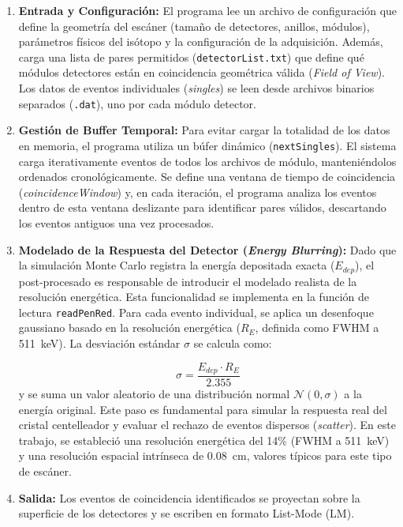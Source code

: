 \begin{enumerate}
  \item \textbf{Entrada y Configuración:}
        El programa lee un archivo de configuración que define la geometría del escáner (tamaño de detectores, anillos, módulos), parámetros físicos del isótopo y la configuración de la adquisición. Además, carga una lista de pares permitidos (\texttt{detectorList.txt}) que define qué módulos detectores están en coincidencia geométrica válida (\textit{Field of View}). Los datos de eventos individuales (\textit{singles}) se leen desde archivos binarios separados (\texttt{.dat}), uno por cada módulo detector.
  \item \textbf{Gestión de Buffer Temporal:}
        Para evitar cargar la totalidad de los datos en memoria, el programa utiliza un búfer dinámico (\texttt{nextSingles}). El sistema carga iterativamente eventos de todos los archivos de módulo, manteniéndolos ordenados cronológicamente. Se define una ventana de tiempo de coincidencia (\textit{coincidenceWindow}) y, en cada iteración, el programa analiza los eventos dentro de esta ventana deslizante para identificar pares válidos, descartando los eventos antiguos una vez procesados.
  \item \textbf{Modelado de la Respuesta del Detector (\textit{Energy Blurring}):}
        Dado que la simulación Monte Carlo registra la energía depositada exacta ($E_{dep}$), el post-procesado es responsable de introducir el modelado realista de la resolución energética. Esta funcionalidad se implementa en la función de lectura \texttt{readPenRed}. Para cada evento individual, se aplica un desenfoque gaussiano basado en la resolución energética ($R_E$, definida como FWHM a \SI{511}{\kilo\electronvolt}). La desviación estándar $\sigma$ se calcula como:

        \begin{equation}
          \sigma = \frac{E_{dep} \cdot R_E}{2.355}
        \end{equation}
        y se suma un valor aleatorio de una distribución normal $\mathcal{N}(0, \sigma)$ a la energía original. Este paso es fundamental para simular la respuesta real del cristal centelleador y evaluar el rechazo de eventos dispersos (\textit{scatter}). En este trabajo, se estableció una resolución energética del 14\% (FWHM a \SI{511}{\kilo\electronvolt}) y una resolución espacial intrínseca de \SI{0.08}{cm}, valores típicos para este tipo de escáner.

  \item \textbf{Salida:}
        Los eventos de coincidencia identificados se proyectan sobre la superficie de los detectores y se escriben en formato List-Mode (LM).
\end{enumerate}

